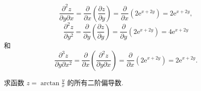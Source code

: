 \[
\frac{{\partial }^{2}z}{\partial y\partial x} = \frac{\partial }{\partial x}\left( \frac{\partial z}{\partial y}\right)  = \frac{\partial }{\partial x}\left( {2{\mathrm{e}}^{x + {2y}}}\right)  = 2{\mathrm{e}}^{x + {2y}},
\]
\[
\frac{{\partial }^{2}z}{\partial {y}^{2}} = \frac{\partial }{\partial y}\left( \frac{\partial z}{\partial y}\right)  = \frac{\partial }{\partial y}\left( {2{\mathrm{e}}^{x + {2y}}}\right)  = 4{\mathrm{e}}^{x + {2y}}
\]
和
\[
\frac{{\partial }^{3}z}{\partial y\partial {x}^{2}} = \frac{\partial }{\partial x}\left( \frac{{\partial }^{2}z}{\partial y\partial x}\right)  = \frac{\partial }{\partial x}\left( {2{\mathrm{e}}^{x + {2y}}}\right)  = 2{\mathrm{e}}^{x + {2y}}.
\]
\begin{example}

\end{example}
求函数 \(z = \arctan \frac{y}{x}\) 的所有二阶偏导数.

